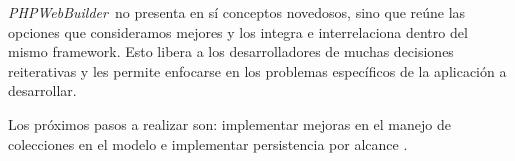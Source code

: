 \documentclass[a4paper,10pt]{article}
\newcommand{\comment}[1]{}
\newcommand{\PWB}{\emph{PHPWebBuilder}}
\newcommand{\sourcecode}[1]{
\begin{minipage}{12cm}
\begin{lgrind}

\end{lgrind}
\end{minipage}
}
\begin{document}
\PWB\ no presenta en sí conceptos novedosos, sino que reúne las opciones que consideramos mejores y los integra e interrelaciona dentro del mismo framework. Esto libera a los desarrolladores de muchas decisiones reiterativas y les permite enfocarse en los problemas específicos de la aplicación a desarrollar.

Los próximos pasos a realizar son: implementar mejoras en el manejo de colecciones en el modelo e implementar persistencia por alcance \cite{jpox,jdo}.






\comment{
\setcounter{section}{0}
\newpage
\section*{Apéndices}
\section{Código completo}

Modelo:

\sourcecode{src/Post.class.php.tex}
\sourcecode{src/Tag.class.php.tex}

Controller:

\sourcecode{src/PostItem.class.php.tex}
\sourcecode{src/PostList.class.php.tex}
\sourcecode{src/BlogComponent.class.php.tex}
}
\end{document}
